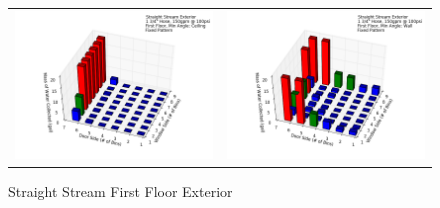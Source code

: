 \documentclass{article}
\begin{document}
\begin{appendices}
\begin{figure}[ht]
{\begin{tabular*}{\textwidth}{lr}
\includegraphics[width=3.2in]{../ADD_Analysis/Figures/15-12-08_120311_Datafile_Straight_Stream_Exterior.png} &
\includegraphics[width=3.2in]{../ADD_Analysis/Figures/15-12-08_121011_Datafile_Straight_Stream_Exterior.png} \\
\end{tabular*}}
\centering
{}
\caption{Straight Stream First Floor Exterior}
\label{fig:Straight Stream First Floor Exterior}
\end{figure}

\clearpage


\end{appendices}
\end{document}
